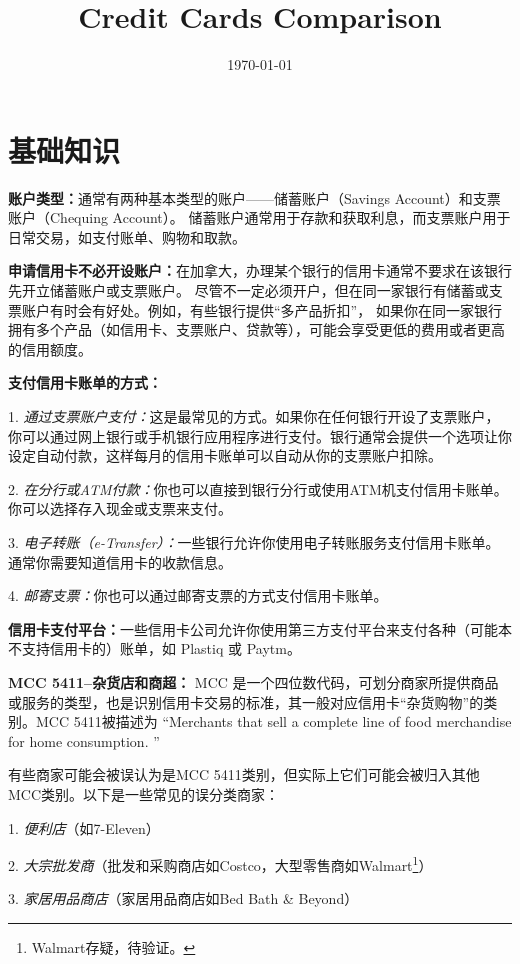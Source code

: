 \documentclass{article}
\title{Credit Cards Comparison}
\date{\today} %
\begin{document}
\maketitle

\section{基础知识}

\textbf{账户类型：}通常有两种基本类型的账户——储蓄账户（Savings Account）和支票账户（Chequing Account）。
储蓄账户通常用于存款和获取利息，而支票账户用于日常交易，如支付账单、购物和取款。

\textbf{申请信用卡不必开设账户：}在加拿大，办理某个银行的信用卡通常不要求在该银行先开立储蓄账户或支票账户。
尽管不一定必须开户，但在同一家银行有储蓄或支票账户有时会有好处。例如，有些银行提供“多产品折扣”，
如果你在同一家银行拥有多个产品（如信用卡、支票账户、贷款等），可能会享受更低的费用或者更高的信用额度。

\textbf{支付信用卡账单的方式：}

1. \emph{通过支票账户支付：}这是最常见的方式。如果你在任何银行开设了支票账户，你可以通过网上银行或手机银行应用程序进行支付。银行通常会提供一个选项让你设定自动付款，这样每月的信用卡账单可以自动从你的支票账户扣除。

2. \emph{在分行或ATM付款：}你也可以直接到银行分行或使用ATM机支付信用卡账单。你可以选择存入现金或支票来支付。

3. \emph{电子转账（e-Transfer）：}一些银行允许你使用电子转账服务支付信用卡账单。通常你需要知道信用卡的收款信息。

4. \emph{邮寄支票：}你也可以通过邮寄支票的方式支付信用卡账单。

\textbf{信用卡支付平台：}一些信用卡公司允许你使用第三方支付平台来支付各种（可能本不支持信用卡的）账单，如 Plastiq 或 Paytm。

\textbf{MCC 5411--杂货店和商超：}
MCC 是一个四位数代码，可划分商家所提供商品或服务的类型，也是识别信用卡交易的标准，其一般对应信用卡“杂货购物”的类别。MCC 5411被描述为
``Merchants that sell a complete line of food merchandise for home consumption. ''

有些商家可能会被误认为是MCC 5411类别，但实际上它们可能会被归入其他MCC类别。以下是一些常见的误分类商家：

1. \emph{便利店}（如7-Eleven）

2. \emph{大宗批发商}（批发和采购商店如Costco，大型零售商如Walmart\footnote{Walmart存疑，待验证。}）

3. \emph{家居用品商店}（家居用品商店如Bed Bath \& Beyond）
\end{document}
